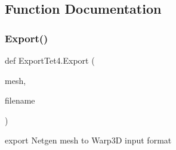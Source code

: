 \subsection{Function Documentation}
\mbox{\label{a00214_aea0f50185b92cacceb8ca208bba2a6ea}} 
\subsubsection{\texorpdfstring{Export()}{Export()}}
{\footnotesize\ttfamily def Export\+Tet4.\+Export (\begin{DoxyParamCaption}\item[{}]{mesh,  }\item[{}]{filename }\end{DoxyParamCaption})}

\begin{DoxyVerb}export Netgen mesh to Warp3D input format \end{DoxyVerb}
 